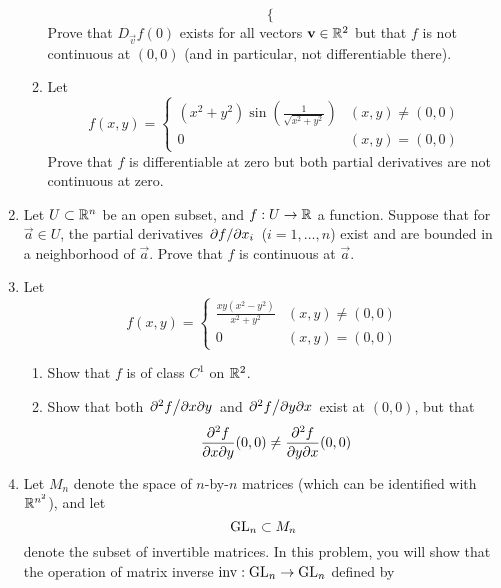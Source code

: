 \documentclass[../psets.tex]{subfiles}
\begin{document}
\begin{enumerate}
\begin{enumerate}
\begin{equation*}
\begin{cases}
            \end{cases}
        \end{equation*}
        Prove that $D_\vec{v}f(0)$ exists for all vectors $\mathbf{v}\in\mathbb{R}^2$ but that $f$ is not continuous at $(0,0)$ (and in particular, not differentiable there).
        \item Let
        \begin{equation*}
            f(x,y) =
            \begin{cases}
                (x^2+y^2)\sin\left( \frac{1}{\sqrt{x^2+y^2}} \right) & (x,y)\neq(0,0)\\
                0 & (x,y)=(0,0)
            \end{cases}
        \end{equation*}
        Prove that $f$ is differentiable at zero but both partial derivatives are not continuous at zero.
    \end{enumerate}
    \item Let $U\subset\mathbb{R}^n$ be an open subset, and $f:U\to\mathbb{R}$ a function. Suppose that for $\vec{a}\in U$, the partial derivatives $\pdv*{f}{x_i}$ ($i=1,\dots,n$) exist and are bounded in a neighborhood of $\vec{a}$. Prove that $f$ is continuous at $\vec{a}$.
    \item Let
    \begin{equation*}
        f(x,y) =
        \begin{cases}
            \frac{xy(x^2-y^2)}{x^2+y^2} & (x,y)\neq(0,0)\\
            0 & (x,y)=(0,0)
        \end{cases}
    \end{equation*}
    \begin{enumerate}
        \item Show that $f$ is of class $C^1$ on $\mathbb{R}^2$.
        \item Show that both $\pdv*[2]{f}{x}{y}$ and $\pdv*[2]{f}{y}{x}$ exist at $(0,0)$, but that
        \begin{equation*}
            {\pdv[2]{f}{x}{y}}(0,0) \neq {\pdv[2]{f}{y}{x}}(0,0)
        \end{equation*}
    \end{enumerate}
    \item Let $M_n$ denote the space of $n$-by-$n$ matrices (which can be identified with $\mathbb{R}^{n^2}$), and let
    \begin{equation*}
        \text{GL}_{n} \subset M_n
    \end{equation*}
    denote the subset of invertible matrices. In this problem, you will show that the operation of matrix inverse $\operatorname{inv}:\text{GL}_{n}\to\text{GL}_{n}$ defined by

\end{enumerate}
\end{document}

